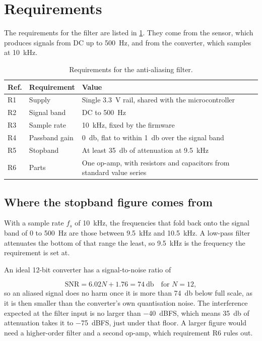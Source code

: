 
\section{Requirements}
\label{sec:requirements}

The requirements for the filter are listed in \cref{tab:requirements}. They
come from the sensor, which produces signals from DC up to
\qty{500}{\hertz}, and from the converter, which samples at
\qty{10}{\kilo\hertz}.

\begin{table}[htbp]
\centering
\begin{tabularx}{\textwidth}{@{} l l X @{}}
\toprule
\textbf{Ref.} & \textbf{Requirement} & \textbf{Value} \\
\midrule
R1 & Supply           & Single \qty{3.3}{\volt} rail, shared with the microcontroller \\
R2 & Signal band      & DC to \qty{500}{\hertz} \\
R3 & Sample rate      & \qty{10}{\kilo\hertz}, fixed by the firmware \\
R4 & Passband gain    & \qty{0}{\decibel}, flat to within \qty{1}{\decibel} over the signal band \\
R5 & Stopband         & At least \qty{35}{\decibel} of attenuation at \qty{9.5}{\kilo\hertz} \\
R6 & Parts            & One op-amp, with resistors and capacitors from standard value series \\
\bottomrule
\end{tabularx}
\caption{Requirements for the anti-aliasing filter.}
\label{tab:requirements}
\end{table}

\subsection{Where the stopband figure comes from}

With a sample rate $f_s$ of \qty{10}{\kilo\hertz}, the frequencies that fold
back onto the signal band of 0 to \qty{500}{\hertz} are those between
\qty{9.5}{\kilo\hertz} and \qty{10.5}{\kilo\hertz}. A low-pass filter
attenuates the bottom of that range the least, so \qty{9.5}{\kilo\hertz} is
the frequency the requirement is set at.

An ideal 12-bit converter has a signal-to-noise ratio of

\begin{equation}
  \label{eq:idealSnr}
  \mathrm{SNR} = 6.02N + 1.76 = \qty{74}{\decibel}
  \quad\text{for } N = 12,
\end{equation}
so an aliased signal does no harm once it is more than \qty{74}{\decibel}
below full scale, as it is then smaller than the converter's own quantisation
noise. The interference expected at the filter input is no larger than
\qty{-40}{dBFS}, which means \qty{35}{\decibel} of attenuation takes it to
\qty{-75}{dBFS}, just under that floor. A larger figure would need a
higher-order filter and a second op-amp, which requirement R6 rules out.
